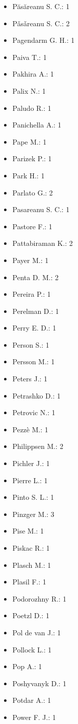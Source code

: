 \begin{itemize}
\item P\u{a}s\u{a}reanu S. C.: 1
\item P\v{a}s\v{a}reanu S. C.: 2
\item Pagendarm G. H.: 1
\item Paiva T.: 1
\item Pakhira A.: 1
\item Palix N.: 1
\item Paludo R.: 1
\item Panichella A.: 1
\item Pape M.: 1
\item Parizek P.: 1
\item Park H.: 1
\item Parlato G.: 2
\item Pasareanu S. C.: 1
\item Pastore F.: 1
\item Pattabiraman K.: 2
\item Payer M.: 1
\item Penta D. M.: 2
\item Pereira P.: 1
\item Perelman D.: 1
\item Perry E. D.: 1
\item Person S.: 1
\item Persson M.: 1
\item Peters J.: 1
\item Petrashko D.: 1
\item Petrovic N.: 1
\item Pezz\`{e} M.: 1
\item Philippsen M.: 2
\item Pichler J.: 1
\item Pierre L.: 1
\item Pinto S. L.: 1
\item Pinzger M.: 3
\item Pise M.: 1
\item Piskac R.: 1
\item Plasch M.: 1
\item Plasil F.: 1
\item Podorozhny R.: 1
\item Poetzl D.: 1
\item Pol de van J.: 1
\item Pollock L.: 1
\item Pop A.: 1
\item Poshyvanyk D.: 1
\item Potdar A.: 1
\item Power F. J.: 1

\end{itemize}
